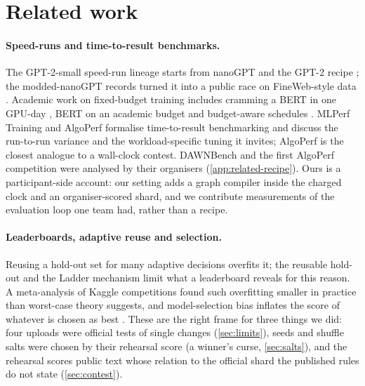 \section{Related work}
\label{sec:related}

\paragraph{Speed-runs and time-to-result benchmarks.} The GPT-2-small speed-run lineage starts from nanoGPT
\citep{karpathy2022nanogpt} and the GPT-2 recipe \citep{radford2019gpt2}; the modded-nanoGPT records
\citep{jordan2024moddednanogpt} turned it into a public race on FineWeb-style data \citep{penedo2024fineweb}.
Academic work on fixed-budget training includes cramming a BERT in one GPU-day \citep{geiping2023cramming}, BERT on
an academic budget \citep{izsak2021academic} and budget-aware schedules \citep{li2020budgeted}. MLPerf Training
\citep{mattson2020mlperf} and AlgoPerf \citep{dahl2023algoperf} formalise time-to-result benchmarking and discuss
the run-to-run variance and the workload-specific tuning it invites; AlgoPerf is the closest analogue to a
wall-clock contest. DAWNBench \citep{coleman2017dawnbench,coleman2019dawnbench} and the first AlgoPerf competition
\citep{kasimbeg2025algoperf} were analysed by their organisers (\cref{app:related-recipe}). Ours is a
participant-side account: our setting adds a graph compiler inside the charged clock and an organiser-scored shard,
and we contribute measurements of the evaluation loop one team had, rather than a recipe.

\paragraph{Leaderboards, adaptive reuse and selection.} Reusing a hold-out set for many adaptive decisions
overfits it; the reusable hold-out \citep{dwork2015reusable} and the Ladder mechanism \citep{blum2015ladder} limit
what a leaderboard reveals for this reason. A meta-analysis of Kaggle competitions \citep{roelofs2019metaanalysis}
found such overfitting smaller in practice than worst-case theory suggests, and model-selection bias inflates the
score of whatever is chosen as best \citep{cawley2010overfitting}. These are the right frame for three things we
did: four uploads were official tests of single changes (\cref{sec:limits}), seeds and shuffle salts were chosen
by their rehearsal score (a winner's curse, \cref{sec:salts}), and the rehearsal scores public text whose relation to
the official shard the published rules do not state (\cref{sec:contest}).

